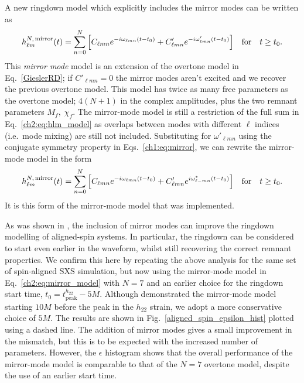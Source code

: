 A new ringdown model which explicitly includes the mirror modes can be written as
\begin{equation}
    h_{\ell m}^{N,\, {\rm mirror}}(t) = \sum_{n=0}^N \qty[ C_{\ell m n} e^{-i \omega_{\ell m n}(t-t_0)} + C'_{\ell m n} e^{-i \omega'_{\ell m n}(t-t_0)} ]\quad \textrm{for} \quad t \geq t_0.
\end{equation}
This \emph{mirror mode} model is an extension of the overtone model in Eq.~\ref{GieslerRD};
if $C'_{\ell m n} = 0$ the mirror modes aren't excited and we recover the previous overtone model. 
This model has twice as many free parameters as the overtone model; $4(N+1)$ in the complex amplitudes, plus the two remnant parameters $M_f,\; \chi_f$.
The mirror-mode model is still a restriction of the full sum in Eq.~\ref{ch2:eq:hlm_model} as overlaps between modes with different $\ell$ indices (i.e.\ mode mixing) are still not included.
Substituting for $\omega'_{\ell m n}$ using the conjugate symmetry property in Eqs.~\ref{ch1:eq:mirror}, we can rewrite the mirror-mode model in the form
\begin{equation} \label{ch2:eq:mirror_model}
   h_{\ell m}^{N,\, {\rm mirror}}(t) = \sum_{n=0}^N \qty[ C_{\ell m n} e^{-i \omega_{\ell m n}(t-t_0)} + C'_{\ell m n} e^{i \omega^*_{\ell -m n}(t-t_0)} ]\quad \textrm{for} \quad t \geq t_0.
\end{equation}
It is this form of the mirror-mode model that was implemented.

As was shown in \cite{Dhani:2020nik}, the inclusion of mirror modes can improve the ringdown modelling of aligned-spin systems. In particular, the ringdown can be considered to start even earlier in the waveform, whilst still recovering the correct remnant properties. We confirm this here by repeating the above analysis for the same set of spin-aligned SXS simulation, but now using the mirror-mode model in Eq.~\ref{ch2:eq:mirror_model} with $N=7$ and an earlier choice for the ringdown start time, $t_0 = t_{\mathrm{peak}}^{h_{22}} - 5M$.
Although \cite{Dhani:2020nik} demonstrated the mirror-mode model starting $10M$ before the peak in the $h_{22}$ strain, we adopt a more conservative choice of $5M$.
The results are shown in Fig.~\ref{aligned_spin_epsilon_hist} plotted using a dashed line. 
The addition of mirror modes gives a small improvement in the mismatch, but this is to be expected with the increased number of parameters.
However, the $\epsilon$ histogram shows that the overall performance of the mirror-mode model is comparable to that of the $N=7$ overtone model, despite the use of an earlier start time.


